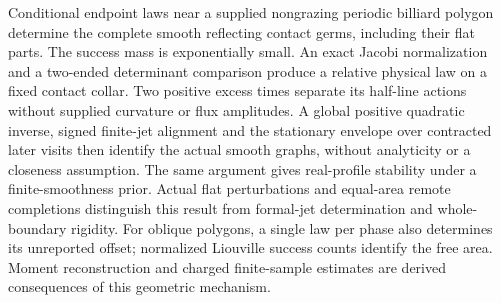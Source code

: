 Conditional endpoint laws near a supplied nongrazing periodic billiard
polygon determine the complete smooth reflecting contact germs, including
their flat parts.  The success mass is exponentially small.  An exact
Jacobi normalization and a two-ended determinant comparison produce a
relative physical law on a fixed contact collar.  Two positive excess
times separate its half-line actions without supplied curvature or flux
amplitudes.  A global positive quadratic inverse, signed finite-jet
alignment and the stationary envelope over contracted later visits then
identify the actual smooth graphs, without analyticity or a closeness
assumption.  The same argument gives real-profile stability under a
finite-smoothness prior.  Actual flat perturbations and equal-area remote
completions distinguish this result from formal-jet determination and
whole-boundary rigidity.  For oblique polygons, a single law per phase
also determines its unreported offset; normalized Liouville success counts
identify the free area.  Moment reconstruction and charged finite-sample
estimates are derived consequences of this geometric mechanism.
